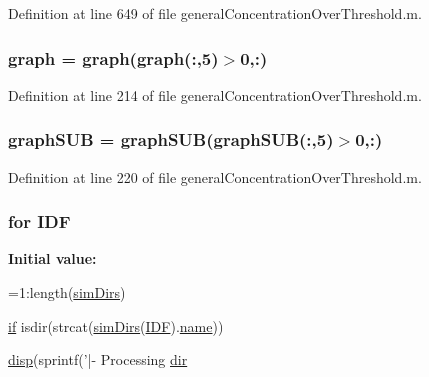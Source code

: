 Definition at line 649 of file general\+Concentration\+Over\+Threshold.\+m.

\hypertarget{a00028_a91819eaefb434ac459f17b3caa03713d}{
\subsubsection[{graph}]{ graph = graph(graph(\+:,5)$>$0,\+:)}}\label{a00028_a91819eaefb434ac459f17b3caa03713d}


Definition at line 214 of file general\+Concentration\+Over\+Threshold.\+m.

\hypertarget{a00028_a0c738fa68cf19f3aeef6b6a7a723577c}{
\subsubsection[{graph\+S\+U\+B}]{ graph\+S\+U\+B = graph\+S\+U\+B(graph\+S\+U\+B(\+:,5)$>$0,\+:)}}\label{a00028_a0c738fa68cf19f3aeef6b6a7a723577c}


Definition at line 220 of file general\+Concentration\+Over\+Threshold.\+m.

\hypertarget{a00028_a8acdc1bee73718b1ffcfc7eb26968f48}{
\subsubsection[{I\+D\+F}]{\setlength{\rightskip}{0pt plus 5cm}for I\+D\+F}}\label{a00028_a8acdc1bee73718b1ffcfc7eb26968f48}
{\bfseries Initial value\+:}
\begin{DoxyCode}
=1:length(\hyperlink{a00028_aae5035eb84b89176ed5b06e136325eff}{simDirs})
    
    \hyperlink{a00028_a69389e83631699e80408490e48a695b0}{if} isdir(strcat(\hyperlink{a00028_aae5035eb84b89176ed5b06e136325eff}{simDirs}(\hyperlink{a00028_a8acdc1bee73718b1ffcfc7eb26968f48}{IDF}).\hyperlink{a00027_abbf559a76fab59203496b0847ab9502a}{name}))
        
        \hyperlink{a00028_ae60321a34c0a93776384a837b8f3a9e1}{disp}(sprintf('|- Processing \hyperlink{a00113_a4ca269cf93df1b512b52174c1a256fe5}{dir} %
\end{DoxyCode}


